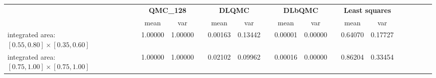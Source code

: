 \begin{tabular}{lcccccccccccccccc}
\toprule
 &\multicolumn{2}{c}{\textbf{QMC\_128}}&&\multicolumn{2}{c}{\textbf{DLQMC}}&&\multicolumn{2}{c}{\textbf{DLbQMC}}&&\multicolumn{2}{c}{\textbf{Least squares}}\\ 
\cmidrule(r){2-3} \cmidrule(r){5-6} \cmidrule(r){8-9}
 &mean&var&&mean&var&&mean&var&&mean&var\\ 
\midrule
integrated area: $[0.55,0.80]\times [0.35,0.60]$ &1.00000&1.00000&&0.00163&0.13442&&0.00001&0.00000&&0.64070&0.17727\\ 
integrated area: $[0.75,1.00]\times [0.75,1.00]$ &1.00000&1.00000&&0.02102&0.09962&&0.00016&0.00000&&0.86204&0.33454\\ 
\bottomrule
\end{tabular}


